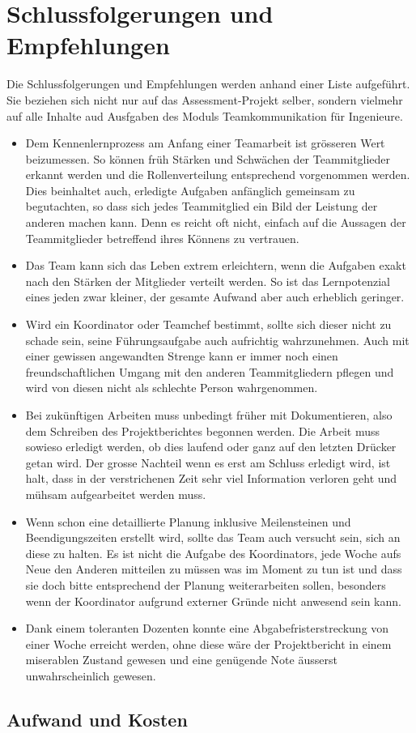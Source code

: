 \chapter{Schlussfolgerungen und Empfehlungen}
Die Schlussfolgerungen und Empfehlungen werden anhand einer Liste aufgeführt. Sie beziehen sich nicht nur auf das Assessment-Projekt selber, sondern vielmehr auf alle Inhalte aud Ausfgaben des Moduls Teamkommunikation für Ingenieure. 

\begin{itemize}
\item Dem Kennenlernprozess am Anfang einer Teamarbeit ist grösseren Wert beizumessen. So können früh Stärken und Schwächen der Teammitglieder erkannt werden und die Rollenverteilung entsprechend vorgenommen werden. Dies beinhaltet auch, erledigte Aufgaben anfänglich gemeinsam zu begutachten, so dass sich jedes Teammitglied ein Bild der Leistung der anderen machen kann. Denn es reicht oft nicht, einfach auf die Aussagen der Teammitglieder betreffend ihres Könnens zu vertrauen.
\item Das Team kann sich das Leben extrem erleichtern, wenn die Aufgaben exakt nach den Stärken der Mitglieder verteilt werden. So ist das Lernpotenzial eines jeden zwar kleiner, der gesamte Aufwand aber auch erheblich geringer.
\item Wird ein Koordinator oder Teamchef bestimmt, sollte sich dieser nicht zu schade sein, seine Führungsaufgabe auch aufrichtig wahrzunehmen. Auch mit einer gewissen angewandten Strenge kann er immer noch einen freundschaftlichen Umgang mit den anderen Teammitgliedern pflegen und wird von diesen nicht als schlechte Person wahrgenommen.
\item Bei zukünftigen Arbeiten muss unbedingt früher mit Dokumentieren, also dem Schreiben des Projektberichtes begonnen werden. Die Arbeit muss sowieso erledigt werden, ob dies laufend oder ganz auf den letzten Drücker getan wird. Der grosse Nachteil wenn es erst am Schluss erledigt wird, ist halt, dass in der verstrichenen Zeit sehr viel Information verloren geht und mühsam aufgearbeitet werden muss.
\item Wenn schon eine detaillierte Planung inklusive Meilensteinen und Beendigungszeiten erstellt wird, sollte das Team auch versucht sein, sich an diese zu halten. Es ist nicht die Aufgabe des Koordinators, jede Woche aufs Neue den Anderen mitteilen zu müssen was im Moment zu tun ist und dass sie doch bitte entsprechend der Planung weiterarbeiten sollen, besonders wenn der Koordinator aufgrund externer Gründe nicht anwesend sein kann.
\item Dank einem toleranten Dozenten konnte eine Abgabefristerstreckung von einer Woche erreicht werden, ohne diese wäre der Projektbericht in einem miserablen Zustand gewesen und eine genügende Note äusserst unwahrscheinlich gewesen.
\end{itemize}

\section{Aufwand und Kosten}